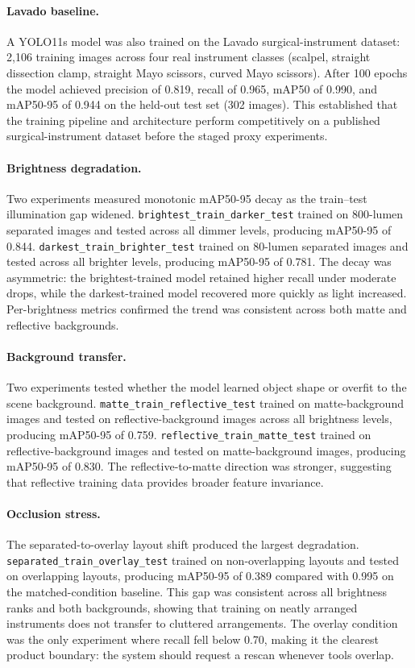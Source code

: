 \documentclass[10pt,a4paper]{article}
\begin{document}
\paragraph{Lavado baseline.}
A YOLO11s model was also trained on the Lavado surgical-instrument
dataset: 2,106 training images across four real instrument classes
(scalpel, straight dissection clamp, straight Mayo scissors, curved
Mayo scissors). After 100 epochs the model achieved precision of 0.819,
recall of 0.965, mAP50 of 0.990, and mAP50-95 of 0.944 on the held-out
test set (302 images). This established that the training pipeline and
architecture perform competitively on a published surgical-instrument
dataset before the staged proxy experiments.
\paragraph{Brightness degradation.}
Two experiments measured monotonic mAP50-95 decay as the train--test
illumination gap widened. \texttt{brightest\_train\_darker\_test} trained
on 800-lumen separated images and tested across all dimmer levels,
producing mAP50-95 of 0.844. \texttt{darkest\_train\_brighter\_test}
trained on 80-lumen separated images and tested across all brighter
levels, producing mAP50-95 of 0.781. The decay was asymmetric: the
brightest-trained model retained higher recall under moderate drops,
while the darkest-trained model recovered more quickly as light
increased. Per-brightness metrics confirmed the trend was consistent
across both matte and reflective backgrounds.
\paragraph{Background transfer.}
Two experiments tested whether the model learned object shape or
overfit to the scene background. \texttt{matte\_train\_reflective\_test}
trained on matte-background images and tested on reflective-background
images across all brightness levels, producing mAP50-95 of 0.759.
\texttt{reflective\_train\_matte\_test} trained on reflective-background
images and tested on matte-background images, producing mAP50-95 of
0.830. The reflective-to-matte direction was stronger, suggesting that
reflective training data provides broader feature invariance.
\paragraph{Occlusion stress.}
The separated-to-overlay layout shift produced the largest degradation.
\texttt{separated\_train\_overlay\_test} trained on non-overlapping
layouts and tested on overlapping layouts, producing mAP50-95 of 0.389
compared with 0.995 on the matched-condition baseline. This gap was
consistent across all brightness ranks and both backgrounds, showing
that training on neatly arranged instruments does not transfer to
cluttered arrangements. The overlay condition was the only experiment
where recall fell below 0.70, making it the clearest product boundary:
the system should request a rescan whenever tools overlap.
\end{document}
